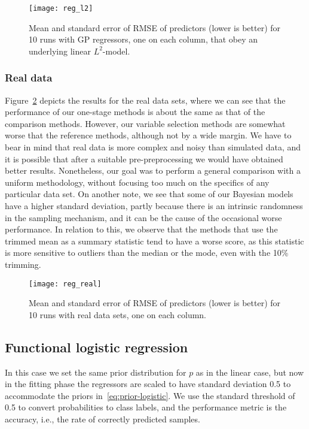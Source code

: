 \documentclass{article}
\numberwithin{equation}{section}
\theoremstyle{plain}
\theoremstyle{definition}
\begin{document}
\begin{figure}[ht!]
  \vspace{2em}
  \centering
  \texttt{[image: reg\_l2]}
  \caption{Mean and standard error of RMSE of predictors (lower is better) for 10 runs with GP regressors, one on each column, that obey an underlying linear \(L^2\)-model.}\label{fig:reg_l2}
\end{figure}

\subsubsection*{Real data}

Figure~\ref{fig:reg_real} depicts the results for the real data sets, where we can see that the performance of our one-stage methods is about the same as that of the comparison methods. However, our variable selection methods are somewhat worse that the reference methods, although not by a wide margin. We have to bear in mind that real data is more complex and noisy than simulated data, and it is possible that after a suitable pre-preprocessing we would have obtained better results. Nonetheless, our goal was to perform a general comparison with a uniform methodology, without focusing too much on the specifics of any particular data set. On another note, we see that some of our Bayesian models have a higher standard deviation, partly because there is an intrinsic randomness in the sampling mechanism, and it can be the cause of the occasional worse performance. In relation to this, we observe that the methods that use the trimmed mean as a summary statistic tend to have a worse score, as this statistic is more sensitive to outliers than the median or the mode, even with the 10\% trimming.

\begin{figure}[ht!]
  \centering
  \texttt{[image: reg\_real]}
  \caption{Mean and standard error of RMSE of predictors (lower is better) for 10 runs with real data sets, one on each column.}\label{fig:reg_real}
\end{figure}

\subsection{Functional logistic regression}\label{sec:experiments-logistic}

In this case we set the same prior distribution for \(p\) as in the linear case, but now in the fitting phase the regressors are scaled to have standard deviation 0.5 to accommodate the priors in~\eqref{eq:prior-logistic}. We use the standard threshold of 0.5 to convert probabilities to class labels, and the performance metric is the accuracy, i.e., the rate of correctly predicted samples.
\end{document}
